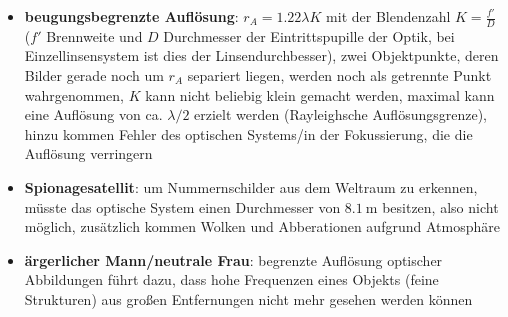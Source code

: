 \linie
\begin{itemize}
    \item
    \textbf{beugungsbegrenzte Auflösung}:
    $r_A = 1.22 \lambda K$ mit der Blendenzahl $K = \frac{f'}{D}$
    ($f'$ Brennweite und $D$ Durchmesser der Eintrittspupille der Optik,
    bei Einzellinsensystem ist dies der Linsendurchbesser), zwei Objektpunkte,
    deren Bilder gerade noch um $r_A$ separiert liegen, werden noch als
    getrennte Punkt wahrgenommen,
    $K$ kann nicht beliebig klein gemacht werden, maximal kann eine Auflösung
    von ca. $\lambda/2$ erzielt werden
    (Rayleighsche Auflösungsgrenze),
    hinzu kommen Fehler des optischen Systems/in der Fokussierung, die
    die Auflösung verringern

    \item
    \textbf{Spionagesatellit}:
    um Nummernschilder aus dem Weltraum zu erkennen, müsste das optische System
    einen Durchmesser von $\SI{8.1}{\meter}$ besitzen, also nicht möglich,
    zusätzlich kommen Wolken und Abberationen aufgrund Atmosphäre

    \item
    \textbf{ärgerlicher Mann/neutrale Frau}:
    begrenzte Auflösung optischer Abbildungen führt dazu, dass hohe Frequenzen
    eines Objekts (feine Strukturen) aus großen Entfernungen nicht mehr gesehen
    werden können
\end{itemize}
\linie
\pagebreak
